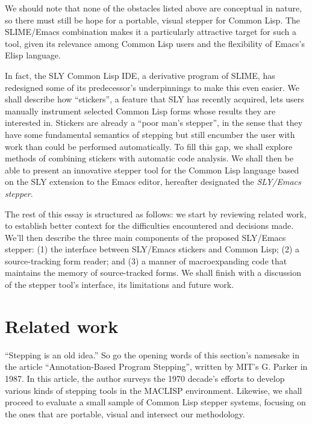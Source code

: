 \documentclass[sigconf]{acmart}
\begin{document}
We should note that none of the obstacles listed above are conceptual
in nature, so there must still be hope for a portable, visual stepper
for Common Lisp. The SLIME/Emacs combination makes it a particularly
attractive target for such a tool, given its relevance among Common
Lisp users and the flexibility of Emacs's Elisp language.

In fact, the SLY Common Lisp IDE\cite{sly}, a derivative program of
SLIME, has redesigned some of its predecessor's underpinnings to make
this even easier.  We shall describe how ``stickers'', a feature that
SLY has recently acquired, lets users manually instrument selected
Common Lisp forms whose results they are interested in.  Stickers are
already a ``poor man's stepper'', in the sense that they have some
fundamental semantics of stepping but still encumber the user with
work than could be performed automatically.  To fill this gap, we
shall explore methods of combining stickers with automatic code
analysis.  We shall then be able to present an innovative stepper tool
for the Common Lisp language based on the SLY extension to the Emacs
editor, hereafter designated the \emph{SLY/Emacs stepper}.


The rest of this essay is structured as follows: we start by reviewing
related work, to establish better context for the difficulties
encountered and decisions made.  We'll then describe the three main
components of the proposed SLY/Emacs stepper: (1) the interface
between SLY/Emacs stickers and Common Lisp; (2) a source-tracking form
reader; and (3) a manner of macroexpanding code that maintains the
memory of source-tracked forms.  We shall finish with a discussion of
the stepper tool's interface, its limitations and future work.

\section{Related work}

``Stepping is an old idea.''  So go the opening words of this
section's namesake in the article ``Annotation-Based Program
Stepping'', written by MIT's G. Parker in 1987\cite{annotation-based}.
In this article, the author surveys the 1970 decade's efforts to
develop various kinds of stepping tools in the MACLISP environment.
Likewise, we shall proceed to evaluate a small sample of Common Lisp
stepper systems, focusing on the ones that are portable, visual and
intersect our methodology.
\end{document}

